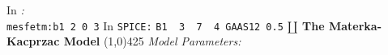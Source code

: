 \documentclass{article}
\begin{document}
\newline
In \textit{\FDA:}\\
\texttt{mesfetm:b1\ 2\ 0\ 3}
\newline
\newline
In \texttt{SPICE:}
\newline
\texttt{B1 \ 3 \ 7 \ 4 GAAS12 0.5}
\newline
\newpage
\noindent\textbf{\large{$\amalg$ The Materka-Kacprzac Model}}
\normalsize
\newline
\linethickness{0.5mm}\line(1,0){425}
\newline
\textit{Model Parameters:}
\newline
\newline
\end{document}
